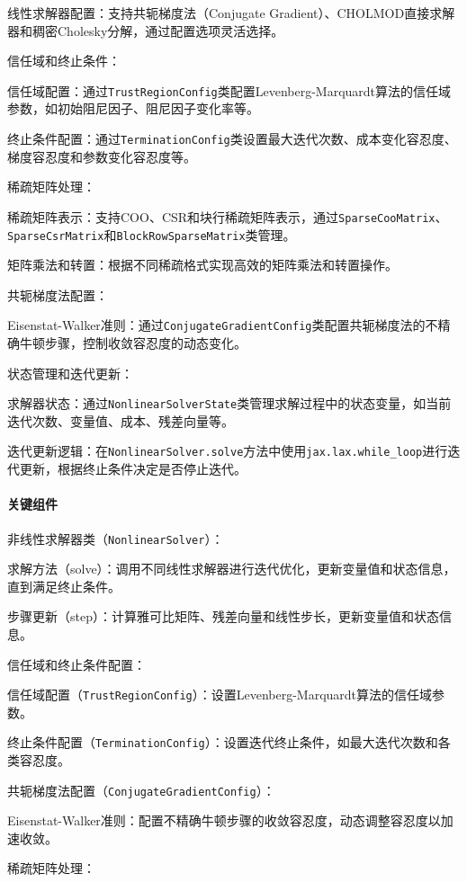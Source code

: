 \documentclass{ctexart}
\begin{document}
线性求解器配置：支持共轭梯度法（Conjugate Gradient）、CHOLMOD直接求解器和稠密Cholesky分解，通过配置选项灵活选择。

信任域和终止条件：

信任域配置：通过\texttt{TrustRegionConfig}类配置Levenberg-Marquardt算法的信任域参数，如初始阻尼因子、阻尼因子变化率等。

终止条件配置：通过\texttt{TerminationConfig}类设置最大迭代次数、成本变化容忍度、梯度容忍度和参数变化容忍度等。

稀疏矩阵处理：

稀疏矩阵表示：支持COO、CSR和块行稀疏矩阵表示，通过\texttt{SparseCooMatrix}、\texttt{SparseCsrMatrix}和\texttt{BlockRowSparseMatrix}类管理。

矩阵乘法和转置：根据不同稀疏格式实现高效的矩阵乘法和转置操作。

共轭梯度法配置：

Eisenstat-Walker准则：通过\texttt{ConjugateGradientConfig}类配置共轭梯度法的不精确牛顿步骤，控制收敛容忍度的动态变化。

状态管理和迭代更新：

求解器状态：通过\texttt{NonlinearSolverState}类管理求解过程中的状态变量，如当前迭代次数、变量值、成本、残差向量等。

迭代更新逻辑：在\texttt{NonlinearSolver.solve}方法中使用\texttt{jax.lax.while\_loop}进行迭代更新，根据终止条件决定是否停止迭代。

\paragraph{关键组件}

非线性求解器类（\texttt{NonlinearSolver}）：

求解方法（solve）：调用不同线性求解器进行迭代优化，更新变量值和状态信息，直到满足终止条件。

步骤更新（step）：计算雅可比矩阵、残差向量和线性步长，更新变量值和状态信息。

信任域和终止条件配置：

信任域配置（\texttt{TrustRegionConfig}）：设置Levenberg-Marquardt算法的信任域参数。

终止条件配置（\texttt{TerminationConfig}）：设置迭代终止条件，如最大迭代次数和各类容忍度。

共轭梯度法配置（\texttt{ConjugateGradientConfig}）：

Eisenstat-Walker准则：配置不精确牛顿步骤的收敛容忍度，动态调整容忍度以加速收敛。

稀疏矩阵处理：
\end{document}
